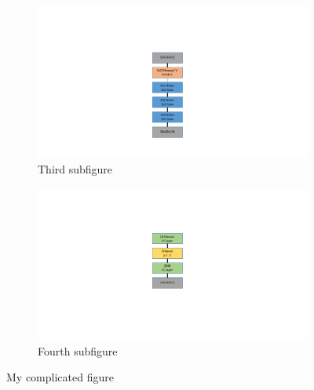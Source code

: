 \documentclass[12pt,conference]{ieeeconf}
\begin{document}
\begin{figure}[t!]
\medskip
\begin{subfigure}{0.35\textwidth}
\centering
\includegraphics[width=.4\linewidth]{section4}
\caption{Third subfigure} \label{fig:c}
\end{subfigure}\hspace*{\fill}
\begin{subfigure}{0.35\textwidth}
\centering
\includegraphics[width=.4\linewidth]{classifier}
\caption{Fourth subfigure} \label{fig:d}
\end{subfigure}


\caption{My complicated figure} \label{fig:1}
\end{figure}

%
\end{document}
